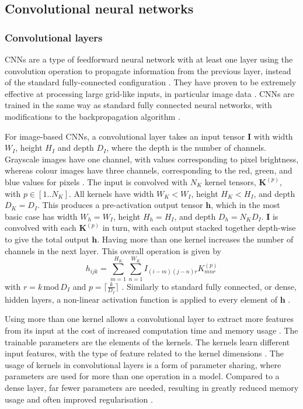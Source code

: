 \documentclass[12pt]{article}
\begin{document}
\subsection{Convolutional neural networks}
\subsubsection{Convolutional layers}
CNNs are a type of feedforward neural network with at least one layer using the convolution operation to propagate information from the previous layer, instead of the standard fully-connected configuration \cite{Goodfellow16}. They have proven to be extremely effective at processing large grid-like inputs, in particular image data \cite{Shrestha19}. CNNs are trained in the same way as standard fully connected neural networks, with modifications to the backpropagation algorithm \cite{Bengio93}.

For image-based CNNs, a convolutional layer takes an input tensor $\bm{I}$ with width $W_I$, height $H_I$ and depth $D_I$, where the depth is the number of channels. Grayscale images have one channel, with values corresponding to pixel brightness, whereas colour images have three channels, corresponding to the red, green, and blue values for pixels \cite{Aghdam17, Goodfellow16}. The input is convolved with $N_K$ kernel tensors, $\bm{K}^{(p)}$, with $p\in[1..N_K]$. All kernels have width $W_K<W_I$, height $H_K<H_I$, and depth $D_K=D_I$. This produces a pre-activation output tensor $\bm{\bm{h}}$, which in the most basic case has width $W_h=W_I$, height $H_h=H_I$, and depth $D_h=N_KD_I$. $\bm{I}$ is convolved with each $\bm{K}^{(p)}$ in turn, with each output stacked together depth-wise to give the total output $\bm{h}$. Having more than one kernel increases the number of channels in the next layer. This overall operation is given by
\begin{equation}
\label{ConvLayer}
h_{ijk}=\sum_{m=1}^{H_K}\sum_{n=1}^{W_K}I_{(i-m)(j-n)r}K_{mnr}^{(p)}
\end{equation}
with $r=k\,\mathrm{mod}\,D_I$ and $p=\lceil\frac{k}{D_I}\rceil$ \cite{Aghdam17, Goodfellow16}. Similarly to standard fully connected, or dense, hidden layers, a non-linear activation function is applied to every element of $\bm{h}$ \cite{Aghdam17, Goodfellow16}. 

Using more than one kernel allows a convolutional layer to extract more features from its input at the cost of increased computation time and memory usage \cite{Goodfellow16}. The trainable parameters are the elements of the kernels. The kernels learn different input features, with the type of feature related to the kernel dimensions \cite{Aghdam17, Goodfellow16}. The usage of kernels in convolutional layers is a form of parameter sharing, where parameters are used for more than one operation in a model. Compared to a dense layer, far fewer parameters are needed, resulting in greatly reduced memory usage and often improved regularisation \cite{Aghdam17, Goodfellow16}. 
\end{document}

